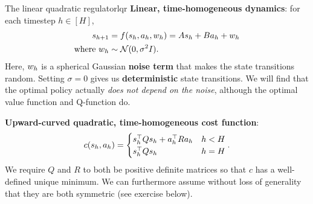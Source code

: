 \documentclass[\main/main]{subfiles}
\begin{document}
\begin{definition}{The linear quadratic regulator}{lqr}
    \textbf{Linear, time-homogeneous dynamics}: for each timestep $h \in [H]$,
    \begin{align*}
        s_{h+1} &= f(s_h, a_h, w_h) = A s_h + B a_h + w_h \\
        \text{where } w_h &\sim \mathcal{N}(0, \sigma^2 I).
    \end{align*}
    Here, $w_h$ is a spherical Gaussian \textbf{noise term} that makes the state transitions random.
    Setting $\sigma = 0$ gives us \textbf{deterministic} state transitions.
    We will find that the optimal policy actually \emph{does not depend on the noise}, although the optimal value function and Q-function do.

    \noindent \textbf{Upward-curved quadratic, time-homogeneous cost function}:
    \[
        c(s_h, a_h) = \begin{cases}
            s_h^\top Q s_h + a_h^\top R a_h & h < H \\
            s_h^\top Q s_h                            & h = H
        \end{cases}.
    \]
    We require $Q$ and $R$ to both be positive definite matrices so that $c$ has a well-defined unique minimum. We can furthermore assume without loss of generality that they are both symmetric (see exercise below).



\end{definition}
\end{document}
